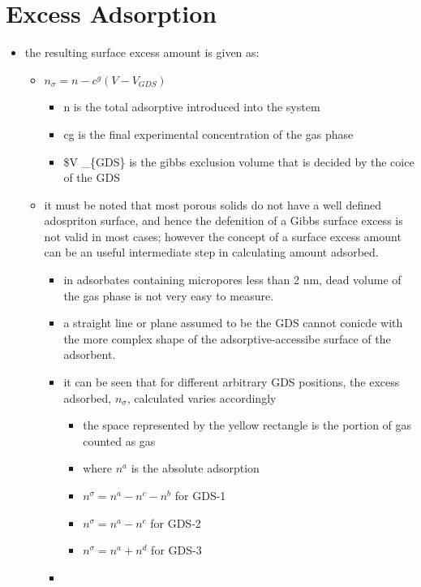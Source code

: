 \documentclass[11pt]{article}
\begin{document}
\section{Excess Adsorption}
\label{sec:org4968e0e}
\begin{itemize}
\item the resulting surface excess amount is given as: \cite{Rouquerol2016}
\begin{itemize}
\item \(n _\sigma = n - c^g (V - V _{GDS})\)
\begin{itemize}
\item n is the total adsorptive introduced into the system
\item cg is the final experimental concentration of the gas phase
\item \$V \_\{GDS\} is the gibbs exclusion volume that is decided by the coice of the GDS
\end{itemize}
\item it must be noted that most porous solids do not have a well defined adospriton surface, and hence the defenition of a Gibbs surface excess is not valid in most cases; however the concept of a surface excess amount can be an useful intermediate step in calculating  amount adsorbed.
\begin{itemize}
\item in adsorbates containing micropores less than 2 nm, dead volume of the gas phase is not very easy to measure.
\item a straight line or plane assumed to be the GDS cannot conicde with the more complex shape of the adsorptive-accessibe surface of the adsorbent.
\item it can be seen that for different arbitrary GDS positions, the excess adsorbed, \(n _{\sigma}\), calculated varies accordingly
\begin{itemize}
\item the space represented by the yellow rectangle is the portion of gas counted as gas
\item where \(n^a\) is the absolute adsorption
\item \(n ^{\sigma} = n^a - n^c - n^b\) for GDS-1
\item \(n ^{\sigma} = n^a - n^c\) for GDS-2
\item \(n ^{\sigma} = n^a + n^d\) for GDS-3
\end{itemize}
\item \begin{center}

\end{center}
\end{itemize}
\end{itemize}
\end{itemize}
\end{document}
